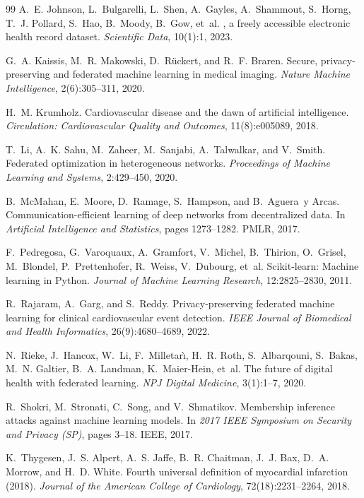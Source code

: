 \begin{thebibliography}{99}
A.~E. Johnson, L.~Bulgarelli, L.~Shen, A.~Gayles, A.~Shammout, S.~Horng, T.~J.
  Pollard, S.~Hao, B.~Moody, B.~Gow, et~al.
, a freely accessible electronic health record dataset.
\newblock \emph{Scientific Data}, 10(1):1, 2023.

G.~A. Kaissis, M.~R. Makowski, D.~R{\"u}ckert, and R.~F. Braren.
\newblock Secure, privacy-preserving and federated machine learning in medical
  imaging.
\newblock \emph{Nature Machine Intelligence}, 2(6):305--311, 2020.

H.~M. Krumholz.
\newblock Cardiovascular disease and the dawn of artificial intelligence.
\newblock \emph{Circulation: Cardiovascular Quality and Outcomes}, 11(8):e005089, 2018.

T.~Li, A.~K. Sahu, M.~Zaheer, M.~Sanjabi, A.~Talwalkar, and V.~Smith.
\newblock Federated optimization in heterogeneous networks.
\newblock \emph{Proceedings of Machine Learning and Systems}, 2:429--450, 2020.

B.~McMahan, E.~Moore, D.~Ramage, S.~Hampson, and B.~Aguera~y Arcas.
\newblock Communication-efficient learning of deep networks from decentralized data.
\newblock In \emph{Artificial Intelligence and Statistics}, pages 1273--1282. PMLR, 2017.

F.~Pedregosa, G.~Varoquaux, A.~Gramfort, V.~Michel, B.~Thirion, O.~Grisel,
  M.~Blondel, P.~Prettenhofer, R.~Weiss, V.~Dubourg, et~al.
\newblock Scikit-learn: Machine learning in {Python}.
\newblock \emph{Journal of Machine Learning Research}, 12:2825--2830, 2011.

R.~Rajaram, A.~Garg, and S.~Reddy.
\newblock Privacy-preserving federated machine learning for clinical cardiovascular event detection.
\newblock \emph{IEEE Journal of Biomedical and Health Informatics}, 26(9):4680--4689, 2022.

N.~Rieke, J.~Hancox, W.~Li, F.~Milletar{\`\i}, H.~R. Roth, S.~Albarqouni,
  S.~Bakas, M.~N. Galtier, B.~A. Landman, K.~Maier-Hein, et~al.
\newblock The future of digital health with federated learning.
\newblock \emph{NPJ Digital Medicine}, 3(1):1--7, 2020.

R.~Shokri, M.~Stronati, C.~Song, and V.~Shmatikov.
\newblock Membership inference attacks against machine learning models.
\newblock In \emph{2017 IEEE Symposium on Security and Privacy (SP)}, pages 3--18. IEEE, 2017.

K.~Thygesen, J.~S. Alpert, A.~S. Jaffe, B.~R. Chaitman, J.~J. Bax, D.~A. Morrow,
  and H.~D. White.
\newblock Fourth universal definition of myocardial infarction (2018).
\newblock \emph{Journal of the American College of Cardiology}, 72(18):2231--2264, 2018.

\end{thebibliography}